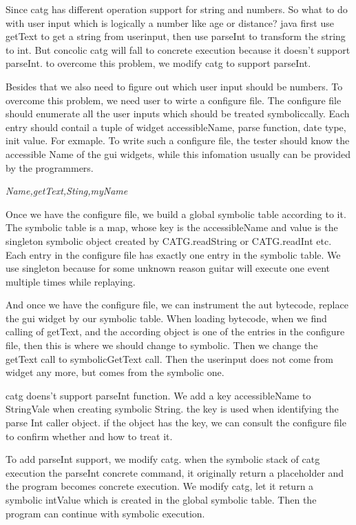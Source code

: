 \documentclass{article}
\begin{document}
Since catg has different operation support for string and numbers. So what to do with user input which is logically a number like age or distance? java first use getText to get a string from userinput, then use parseInt to transform the string to int. But concolic catg will fall to concrete execution because it doesn't support parseInt. to overcome this problem, we modify catg to support parseInt.

Besides that we also need to figure out which user input should be numbers. To overcome this problem, we need user to wirte a configure file. The configure file should enumerate all the user inputs which should be treated symboliccally. Each entry should contail a tuple of widget accessibleName, parse function, date type, init value. For exmaple. To write such a configure file, the tester should know the accessible Name of the gui widgets, while this infomation usually can be provided by the programmers.

\textit{Name,getText,Sting,myName}

Once we have the configure file, we build a global symbolic table according to it. The symbolic table is a map, whose key is the accessibleName and value is the singleton symbolic object created by CATG.readString or CATG.readInt etc. Each entry in the configure file has exactly one entry in the symbolic table. We use singleton because for some unknown reason guitar will execute one event multiple times while replaying.

And once we have the configure file, we can instrument the aut bytecode, replace the gui widget by our symbolic table. When loading bytecode, when we find calling of getText, and the according object is one of the entries in the configure file, then this is where we should change to symbolic. Then we change the getText call to symbolicGetText call. Then the userinput does not come from widget any more, but comes from the symbolic one.

catg doens't support parseInt function. We add a key accessibleName  to StringVale when creating symbolic String. the key is used when identifying the parse Int caller object. if the object has the key, we can consult the configure file to confirm whether and how to treat it.

To add parseInt support, we modify catg. when the symbolic stack of catg execution the parseInt concrete command, it originally return a placeholder and the program becomes concrete execution. We modify catg, let it return a symbolic intValue which is created in the global symbolic table. Then the program can continue with symbolic execution.
\end{document}
